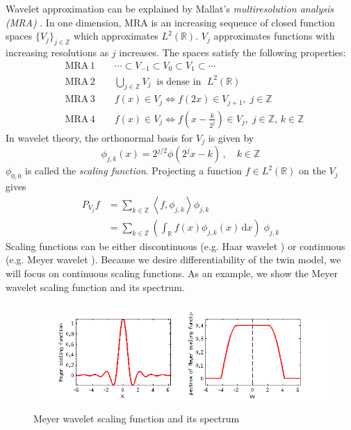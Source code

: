 \documentclass[a4paper,onecolumn]{article}
\theoremstyle{remark}
\begin{document}
\noindent Wavelet approximation can be explained by Mallat's \emph{multiresolution analysis (MRA)}
\cite{wavelet mallat}. In one dimension,
MRA is an increasing sequence of closed function spaces $\{V_j\}_{j\in \mathbb{Z}}$
which approximates $L^2(\mathbb{R})$.
$V_{j}$ approximates functions with increasing resolutions as $j$ increases.
The spaces satisfy the following properties:
\begin{equation*}\begin{split}
    &\textrm{MRA}\, 1\qquad \cdots \subset V_{-1} \subset V_0 \subset V_1 \subset \cdots\\
    &\textrm{MRA}\, 2\qquad 
                    \bigcup_{j\in \mathbb{Z}} V_j \;\; \textrm{is dense in }\; L^2(\mathbb{R})\\
    &\textrm{MRA}\, 3\qquad f(x) \in V_j \Leftrightarrow f(2x) \in V_{j+1}, \; j\in \mathbb{Z}\\
    &\textrm{MRA}\, 4\qquad f(x) \in V_j \Leftrightarrow f(x-\frac{k}{2^j}) \in V_{j},
                    \; j\in \mathbb{Z},\, k\in \mathbb{Z}
\end{split}\end{equation*}
In wavelet theory, the orthonormal basis for $V_j$ is given by
\begin{equation}
    \phi_{j,k}(x) = 2^{j/2} \phi(2^j x-k) \,,\quad k \in \mathbb{Z}
\end{equation}
$\phi_{0,0}$ is called the \emph{scaling function}. 
Projecting a function $f\in L^2(\mathbb{R})$ on the $V_j$ gives
\begin{equation}\begin{split}
    P_{V_j} f &= \sum_{k\in\mathbb{Z}} \left<f, \phi_{j,k}\right> \phi_{j,k}\\
    & = \sum_{k\in\mathbb{Z}} \left( \int_{\mathbb{R}} f(x) \phi_{j,k}(x) \,\textrm{d}x \right)\;
    \phi_{j,k}
    \label{scaling projection}
\end{split}\end{equation}
\noindent Scaling functions can be either discontinuous (e.g. Haar wavelet \cite{haar}) 
or continuous (e.g. Meyer wavelet \cite{Analytic Meyer}). 
Because we desire differentiability of the twin model, we will focus on
continuous scaling functions.
As an example, we show the Meyer wavelet scaling function and its spectrum.
\begin{figure}[H]\begin{center}
    \includegraphics[height=4cm]{meyer.png}
    \caption{Meyer wavelet scaling function and its spectrum}
\end{center}\label{fig:Meyer}\end{figure}
\end{document}
